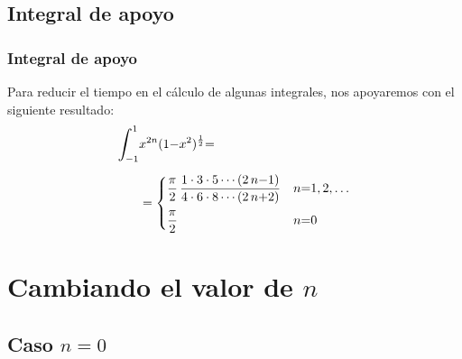 \documentclass[12pt]{beamer}
\begin{document}
\subsection*{Integral de apoyo}

\begin{frame}
\frametitle{Integral de apoyo}
Para reducir el tiempo en el cálculo de algunas integrales, nos apoyaremos con el siguiente resultado:
\pause
\begin{align*}
\scaleint{6ex}_{\bs -1}^{1} &x^{2n} (1 {-} x^{2})^{\frac{1}{2}} {=} \\[0.5em]
&= \begin{cases}
\dfrac{\pi}{2} \, \dfrac{1 \cdot 3 \cdot 5 \cdots (2 \, n {-} 1)}{4 \cdot 6 \cdot 8 \cdots (2 \, n {+} 2)} & n {=} 1, 2, \ldots \\[1em]
\dfrac{\pi}{2} & n {=} 0
\end{cases}
\end{align*}
\end{frame}

\section{Cambiando el valor de \texorpdfstring{$n$}{n}}
\subsection{Caso \texorpdfstring{$n=0$}{n=0}}
\end{document}
